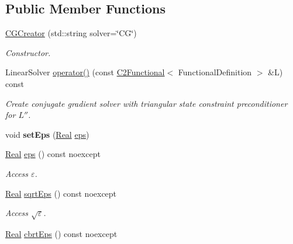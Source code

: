 \subsection*{\-Public \-Member \-Functions}
\begin{DoxyCompactItemize}
\item 
\hyperlink{classSpacy_1_1Kaskade_1_1Lagrange_1_1CGCreator_a238054bebf7f15f35b159a3e1804839d}{\-C\-G\-Creator} (std\-::string solver=\char`\"{}\-C\-G\char`\"{})
\begin{DoxyCompactList}\small\item\em \-Constructor. \end{DoxyCompactList}\item 
\-Linear\-Solver \hyperlink{classSpacy_1_1Kaskade_1_1Lagrange_1_1CGCreator_aa9c6be1ff4b871694dc24d026d7d352b}{operator()} (const \hyperlink{classSpacy_1_1Kaskade_1_1C2Functional}{\-C2\-Functional}$<$ \-Functional\-Definition $>$ \&\-L) const 
\begin{DoxyCompactList}\small\item\em \-Create conjugate gradient solver with triangular state constraint preconditioner for $L''$. \end{DoxyCompactList}\item 
\hypertarget{classSpacy_1_1Mixin_1_1Eps_a6b4c38a60848c0ab665fb3a81e181786}{void {\bfseries set\-Eps} (\hyperlink{classSpacy_1_1Real}{\-Real} \hyperlink{classSpacy_1_1Mixin_1_1Eps_a812b99b0abc1d78a34b4114907f23f52}{eps})}\label{classSpacy_1_1Mixin_1_1Eps_a6b4c38a60848c0ab665fb3a81e181786}

\item 
\hypertarget{classSpacy_1_1Mixin_1_1Eps_a812b99b0abc1d78a34b4114907f23f52}{\hyperlink{classSpacy_1_1Real}{\-Real} \hyperlink{classSpacy_1_1Mixin_1_1Eps_a812b99b0abc1d78a34b4114907f23f52}{eps} () const noexcept}\label{classSpacy_1_1Mixin_1_1Eps_a812b99b0abc1d78a34b4114907f23f52}

\begin{DoxyCompactList}\small\item\em \-Access $\varepsilon$. \end{DoxyCompactList}\item 
\hypertarget{classSpacy_1_1Mixin_1_1Eps_abd50a47b32614a950189855775a09d05}{\hyperlink{classSpacy_1_1Real}{\-Real} \hyperlink{classSpacy_1_1Mixin_1_1Eps_abd50a47b32614a950189855775a09d05}{sqrt\-Eps} () const noexcept}\label{classSpacy_1_1Mixin_1_1Eps_abd50a47b32614a950189855775a09d05}

\begin{DoxyCompactList}\small\item\em \-Access $\sqrt\varepsilon$. \end{DoxyCompactList}\item 
\hypertarget{classSpacy_1_1Mixin_1_1Eps_a4bbca3a4afc878d1a20b6335f35e58f7}{\hyperlink{classSpacy_1_1Real}{\-Real} \hyperlink{classSpacy_1_1Mixin_1_1Eps_a4bbca3a4afc878d1a20b6335f35e58f7}{cbrt\-Eps} () const noexcept}\label{classSpacy_1_1Mixin_1_1Eps_a4bbca3a4afc878d1a20b6335f35e58f7}


\end{DoxyCompactItemize}
